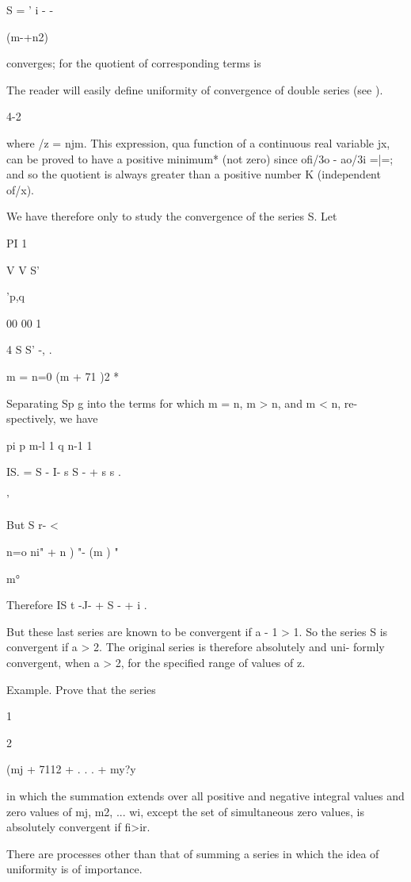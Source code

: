 S = ' i - -

(m-+n2)

converges; for the quotient of corresponding terms is

The reader will easily define uniformity of convergence of double
series (see ).

4-2

%
%

where /z = njm. This expression, qua function of a continuous real
variable jx, can be proved to have a positive minimum* (not zero)
since ofi/3o - ao/3i =|=; and so the quotient is always greater than
a positive number K (independent of/x).

We have therefore only to study the convergence of the series S. Let

PI 1

V V S'

 'p,q

00 00 1

 4 S S' -, .

m = n=0 (m + 71 )2 *

Separating Sp g into the terms for which m = n, m > n, and m < n, re-
spectively, we have

pi p m-l 1 q n-1 1

IS. = S - I- s S - + s s .

'%

But S r- <

n=o ni" + n ) "- (m ) "

m°

Therefore IS t -J- + S - + i .

But these last series are known to be convergent if a - 1 > 1. So the
series S is convergent if a > 2. The original series is therefore
absolutely and uni- formly convergent, when a > 2, for the specified
range of values of z.

Example. Prove that the series

1

2

(mj + 7112 + . . . + my?y

in which the summation extends over all positive and negative integral
values and zero values of mj, m2, ... wi, except the set of
simultaneous zero values, is absolutely convergent if fi>ir.


There are processes other than that of summing a series in which the
idea of uniformity is of importance.


